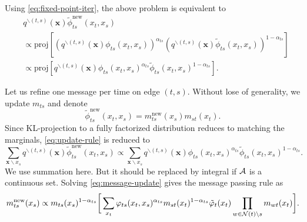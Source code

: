 \documentclass[conference,onecolumn]{IEEEtran}
\begin{document}
Using \autoref{eq:fixed-point-iter}, the above problem is equivalent to
\begin{align}\label{eq:update-rule}
  &q^{\backslash (t,s)}(\bm{x})\tilde{\phi}_{ts}^{\mathrm{new}}(x_t, x_s)  \nonumber\\
  &\propto \text{proj}\left[ \left( q^{\backslash (t,s)}(\bm{x}){\phi}_{ts}(x_t, x_s) \right)^{\alpha_{ts}} \left(q^{\backslash (t,s)}(\bm{x})\tilde{\phi}_{ts}(x_t, x_s)  \right)^{1-\alpha_{ts}} \right] \nonumber \\
  & \propto \text{proj}\left[ q^{\backslash
    (t,s)}(\bm{x}){\phi}_{ts}(x_t, x_s)^{\alpha_{ts}} \tilde{\phi}_{ts}(x_t, x_s)^{1-\alpha_{ts}} \right].
\end{align}

Let us refine one message per time on edge $(t,s)$. Without lose of generality, we update $m_{ts}$ and denote
\begin{equation}
  \tilde{\phi}_{ts}^{\mathrm{new}}(x_t, x_s) = m_{ts}^{\mathrm{new}}(x_s) m_{st}(x_t).
\end{equation}
Since KL-projection to a fully factorized distribution reduces to matching the marginals, \autoref{eq:update-rule} is reduced to
\begin{equation}\label{eq:message-update}
  \sum_{\bm{x}\backslash x_s} q^{\backslash (t,s)}(\bm{x}) \tilde{\phi}_{ts}^{\mathrm{new}}(x_t, x_s) \propto \sum_{\bm{x}\backslash x_s} q^{\backslash (t,s)}(\bm{x}) \phi_{ts}(x_t, x_s)^{\alpha_{ts}} \tilde{\phi}_{ts}(x_t, x_s)^{1-\alpha_{ts}}.
\end{equation}
We use summation here. But it should be replaced by integral if $\mathcal{A}$ is a continuous set.
Solving \autoref{eq:message-update} gives the message passing rule as
\begin{equation}\label{eq:message-rule}
  {m}^{\text{new}}_{ts}(x_s) \propto  m_{ts}(x_s)^{1-\alpha_{ts}} \bigg[
  \sum_{x_t} \varphi_{ts}(x_t, x_s)^{\alpha_{ts}} {m}_{st}(x_t)^{1-\alpha_{ts}}
  \tilde{\varphi}_t(x_t) \prod_{w\in \mathcal{N}(t)\backslash s}m_{wt}(x_t) \bigg].
\end{equation}
\end{document}
